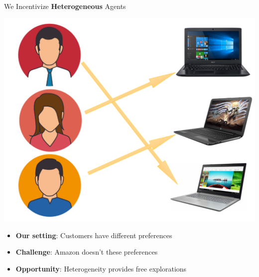 \documentclass[serif]{beamer}
\begin{document}
\begin{frame}{We Incentivize \textbf{Heterogeneous} Agents}
\begin{center}
\includegraphics[scale=0.30]{example2}
\end{center}
\begin{itemize}
\item \textbf{Our setting}: Customers have different preferences
\item \textbf{Challenge}: Amazon doesn't these preferences
\item \textbf{Opportunity}: Heterogeneity provides free explorations
\end{itemize}
\end{frame}




%

\end{document}

